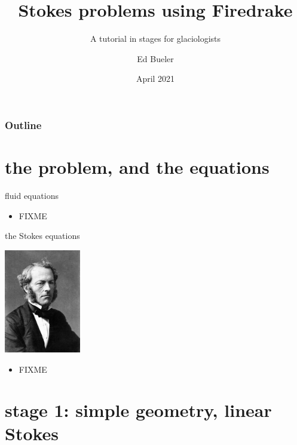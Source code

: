 \documentclass[10pt,hyperref,dvipsnames]{beamer}
\title{Stokes problems using Firedrake}
\subtitle{A tutorial in stages for glaciologists}
\author{Ed Bueler}
\institute[UAF]{University of Alaska Fairbanks}
\date{April 2021}
\begin{document}
\beamertemplatenavigationsymbolsempty

\begin{frame}
  \maketitle
\end{frame}

\begin{frame}
  \frametitle{Outline}
  \tableofcontents[hideallsubsections]
\end{frame}


\section{the problem, and the equations}

\begin{frame}{fluid equations}

\begin{itemize}
\item FIXME
\end{itemize}
\end{frame}


\begin{frame}{the Stokes equations}

\hfill \includegraphics[width=0.25\textwidth]{figs/gstokes.jpg}

\vspace{-20mm}
\begin{itemize}
\item FIXME
\end{itemize}
\end{frame}


\section{stage 1: simple geometry, linear Stokes}
\end{document}
